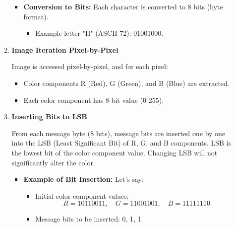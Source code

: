 \documentclass{ittelkom}
\begin{document}
\begin{enumerate}
\begin{enumerate}
\begin{itemize}
                        \item \textbf{Conversion to Bits:}
                              Each character is converted to 8 bits (byte format).
                              \begin{itemize}
                                  \item Example letter "H" (ASCII 72): 01001000.
                              \end{itemize}
                    \end{itemize}

              \item \textbf{Image Iteration Pixel-by-Pixel}

                    Image is accessed pixel-by-pixel, and for each pixel:
                    \begin{itemize}
                        \item Color components R (Red), G (Green), and B (Blue) are extracted.
                        \item Each color component has 8-bit value (0-255).
                    \end{itemize}

              \item \textbf{Inserting Bits to LSB}

                    From each message byte (8 bits), message bits are inserted one by one into the
                    LSB (Least Significant Bit) of R, G, and B components. LSB is the lowest bit of
                    the color component value. Changing LSB will not significantly alter the color.

                    \begin{itemize}
                        \item \textbf{Example of Bit Insertion:}
                              Let's say:
                              \begin{itemize}
                                  \item Initial color component values:
                                        \[
                                            R = 10110011, \quad G = 11001001, \quad B = 11111110
                                        \]
                                  \item Message bits to be inserted: 0, 1, 1.
                              \end{itemize}


\end{itemize}
\end{enumerate}
\end{enumerate}
\end{document}
